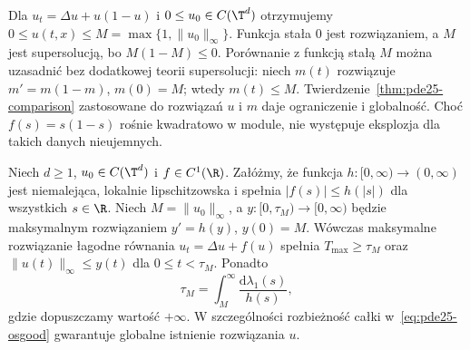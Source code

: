 \begin{przyklad}
\label{ex:pde25-logistic}
Dla $u_t=\Delta u+u(1-u)$ i
$0\le u_0\in C(\T^d)$ otrzymujemy
$0\le u(t,x)\le M=\max\{1,\|u_0\|_\infty\}$.
Funkcja stała $0$ jest rozwiązaniem, a $M$ jest
supersolucją, bo $M(1-M)\le0$. Porównanie z funkcją
stałą $M$ można uzasadnić bez dodatkowej teorii
supersolucji: niech $m(t)$ rozwiązuje
$m'=m(1-m)$, $m(0)=M$; wtedy $m(t)\le M$.
Twierdzenie~\ref{thm:pde25-comparison} zastosowane
do rozwiązań $u$ i $m$ daje ograniczenie i globalność.
Choć $f(s)=s(1-s)$ rośnie kwadratowo w module,
nie występuje eksplozja dla takich danych nieujemnych.
\end{przyklad}


\begin{twierdzenie}
\label{thm:pde25-osgood}
Niech $d\ge1$, $u_0\in C(\T^d)$ i $f\in C^1(\R)$.
Załóżmy, że funkcja $h:[0,\infty)\to(0,\infty)$ jest
niemalejąca, lokalnie lipschitzowska i spełnia
$|f(s)|\le h(|s|)$ dla wszystkich $s\in\R$.
Niech $M=\|u_0\|_\infty$, a $y:[0,\tau_M)\to[0,\infty)$
będzie maksymalnym rozwiązaniem $y'=h(y)$, $y(0)=M$.
Wówczas maksymalne rozwiązanie łagodne równania
$u_t=\Delta u+f(u)$ spełnia
$T_{\max}\ge\tau_M$ oraz
$\|u(t)\|_\infty\le y(t)$ dla $0\le t<\tau_M$.
Ponadto
\begin{equation}\label{eq:pde25-osgood}
 \tau_M=\int_M^\infty\frac{\mathrm d\lambda_1(s)}{h(s)},
\end{equation}
gdzie dopuszczamy wartość $+\infty$.
W szczególności rozbieżność całki w~\eqref{eq:pde25-osgood}
gwarantuje globalne istnienie rozwiązania $u$.
\end{twierdzenie}
